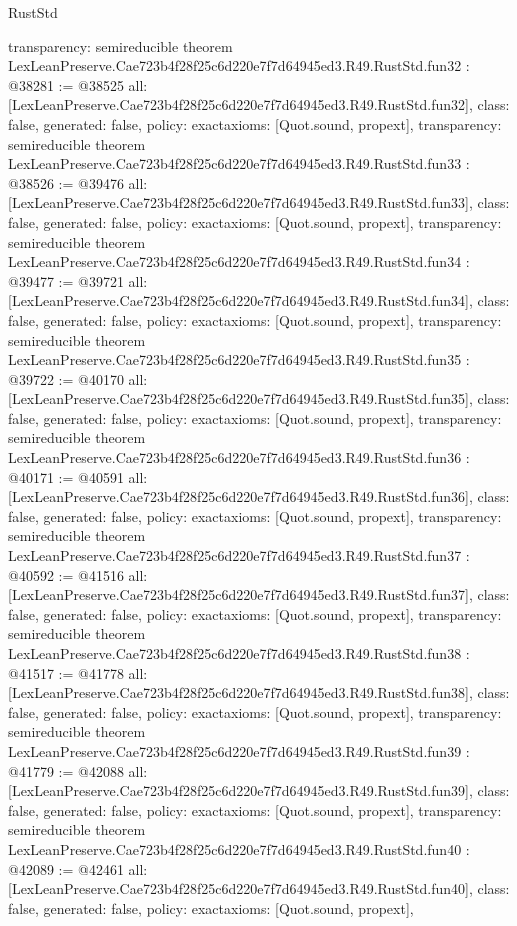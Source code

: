 \begin{lexlean}{RustStd}
\begin{coremodule}
{  transparency: semireducible
}
theorem LexLeanPreserve.Cae723b4f28f25c6d220e7f7d64945ed3.R49.RustStd.fun32 : @38281 := @38525 {
  all: [LexLeanPreserve.Cae723b4f28f25c6d220e7f7d64945ed3.R49.RustStd.fun32],
  class: false,
  generated: false,
  policy: exact{axioms: [Quot.sound, propext]},
  transparency: semireducible
}
theorem LexLeanPreserve.Cae723b4f28f25c6d220e7f7d64945ed3.R49.RustStd.fun33 : @38526 := @39476 {
  all: [LexLeanPreserve.Cae723b4f28f25c6d220e7f7d64945ed3.R49.RustStd.fun33],
  class: false,
  generated: false,
  policy: exact{axioms: [Quot.sound, propext]},
  transparency: semireducible
}
theorem LexLeanPreserve.Cae723b4f28f25c6d220e7f7d64945ed3.R49.RustStd.fun34 : @39477 := @39721 {
  all: [LexLeanPreserve.Cae723b4f28f25c6d220e7f7d64945ed3.R49.RustStd.fun34],
  class: false,
  generated: false,
  policy: exact{axioms: [Quot.sound, propext]},
  transparency: semireducible
}
theorem LexLeanPreserve.Cae723b4f28f25c6d220e7f7d64945ed3.R49.RustStd.fun35 : @39722 := @40170 {
  all: [LexLeanPreserve.Cae723b4f28f25c6d220e7f7d64945ed3.R49.RustStd.fun35],
  class: false,
  generated: false,
  policy: exact{axioms: [Quot.sound, propext]},
  transparency: semireducible
}
theorem LexLeanPreserve.Cae723b4f28f25c6d220e7f7d64945ed3.R49.RustStd.fun36 : @40171 := @40591 {
  all: [LexLeanPreserve.Cae723b4f28f25c6d220e7f7d64945ed3.R49.RustStd.fun36],
  class: false,
  generated: false,
  policy: exact{axioms: [Quot.sound, propext]},
  transparency: semireducible
}
theorem LexLeanPreserve.Cae723b4f28f25c6d220e7f7d64945ed3.R49.RustStd.fun37 : @40592 := @41516 {
  all: [LexLeanPreserve.Cae723b4f28f25c6d220e7f7d64945ed3.R49.RustStd.fun37],
  class: false,
  generated: false,
  policy: exact{axioms: [Quot.sound, propext]},
  transparency: semireducible
}
theorem LexLeanPreserve.Cae723b4f28f25c6d220e7f7d64945ed3.R49.RustStd.fun38 : @41517 := @41778 {
  all: [LexLeanPreserve.Cae723b4f28f25c6d220e7f7d64945ed3.R49.RustStd.fun38],
  class: false,
  generated: false,
  policy: exact{axioms: [Quot.sound, propext]},
  transparency: semireducible
}
theorem LexLeanPreserve.Cae723b4f28f25c6d220e7f7d64945ed3.R49.RustStd.fun39 : @41779 := @42088 {
  all: [LexLeanPreserve.Cae723b4f28f25c6d220e7f7d64945ed3.R49.RustStd.fun39],
  class: false,
  generated: false,
  policy: exact{axioms: [Quot.sound, propext]},
  transparency: semireducible
}
theorem LexLeanPreserve.Cae723b4f28f25c6d220e7f7d64945ed3.R49.RustStd.fun40 : @42089 := @42461 {
  all: [LexLeanPreserve.Cae723b4f28f25c6d220e7f7d64945ed3.R49.RustStd.fun40],
  class: false,
  generated: false,
  policy: exact{axioms: [Quot.sound, propext]},
}
\end{coremodule}
\end{lexlean}
